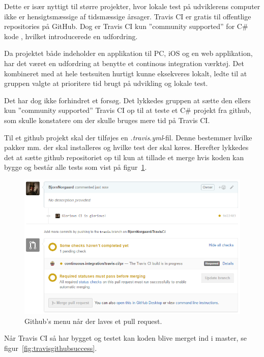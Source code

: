 Dette er især nyttigt til større projekter, hvor lokale test på udviklerens computer ikke er hensigtsmæssige af tidsmæssige årsager. Travis CI er gratis til offentlige repositories på GitHub. Dog er Travis CI kun ''community supported'' for C\# kode \cite{communitysupportedlanguages2016}, hvilket introducerede en udfordring.

Da projektet både indeholder en applikation til PC, iOS og en web applikation, har det været en udfordring at benytte et continous integration værktøj.
Det kombineret med at hele testsuiten hurtigt kunne eksekveres lokalt, ledte til at gruppen valgte at prioritere tid brugt på udvikling og lokale test.

Det har dog ikke forhindret et forsøg. Det lykkedes gruppen at sætte den ellers kun ''community supported'' Travis CI op til at teste et C\# projekt fra github, som skulle konstatere om der skulle bruges mere tid på Travis CI. 

Til et github projekt skal der tilføjes en \textit{.travis.yml}-fil. Denne bestemmer hvilke pakker mm. der skal installeres og hvilke test der skal køres. 
Herefter lykkedes det at sætte github repositoriet op til kun at tillade et merge hvis koden kan bygge og består alle tests som vist på figur~\ref{fig:travispullrequest}.

\begin{figure}[h]
	\centering
	\includegraphics[width=0.9\linewidth]{figs/processProjektGennemforsel/travis/travispullrequest}
	\caption{Github's menu når der laves et pull request.}
	\label{fig:travispullrequest}
\end{figure}

Når Travis CI så har bygget og testet kan koden blive merget ind i master, se figur~\ref{fig:travisgithubsuccess}.

